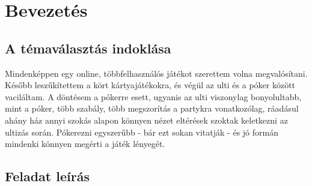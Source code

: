 \section{Bevezetés}

\subsection{A témaválasztás indoklása}
Mindenképpen egy online, többfelhasználós játékot szerettem volna megvalósítani. Később leszűkítettem a kört kártyajátékokra, és végül az ulti és a póker között vaciláltam. A döntésem a pókerre esett, ugyanis az ulti viszonylag bonyolultabb, mint a póker, több szabály, több megszorítás a partykra vonatkozólag, ráadásul ahány ház annyi szokás alapon könnyen nézet eltérések szoktak keletkezni az ultizás során. Pókerezni egyszerűbb - bár ezt sokan vitatják - és jó formán mindenki könnyen megérti a játék lényegét.

\subsection{Feladat leírás}

\cleardoublepage
